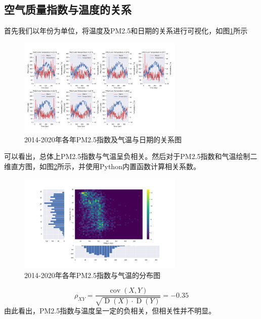 \documentclass[UTF8,a4paper,10pt]{article}
\begin{document}
\subsection{空气质量指数与温度的关系}
\indent 首先我们以年份为单位，将温度及PM2.5和日期的关系进行可视化，如图\ref{Fig.main1}所示

\begin{figure}[H] %
\centering %
\includegraphics[width=0.7\textwidth]{fig//pm25-temp-alltime.png} %
\caption{2014-2020年各年PM2.5指数及气温与日期的关系图} %
\label{Fig.main1} %
\end{figure}

\indent 可以看出，总体上PM2.5指数与气温呈负相关。然后对于PM2.5指数和气温绘制二维直方图，如图\ref{Fig.main2}所示，并使用Python内置函数计算相关系数。

\begin{figure}[H] %
\centering %
\includegraphics[width=0.7\textwidth]{fig//pm25-temp.png} %
\caption{2014-2020年各年PM2.5指数与气温的分布图} %
\label{Fig.main2} %
\end{figure}

\begin{equation}
\rho_{XY} =  \frac{\operatorname{cov}(X, Y)}{\sqrt{\operatorname{D}(X) \cdot \operatorname{D}(Y)}} = -0.35
\end{equation}
\indent 由此看出，PM2.5指数与温度呈一定的负相关，但相关性并不明显。
\end{document}
